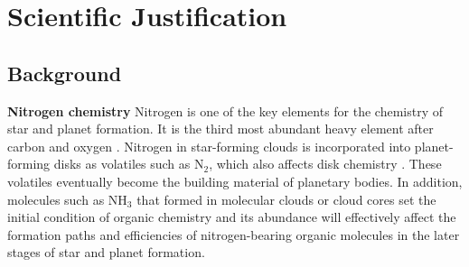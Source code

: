 \documentclass[12pt,a4paper]{article}  %
\newcommand{\ammonia}{NH$_3$\xspace}
\begin{document}
\pagestyle{plain}
 



\section{Scientific Justification}
\subsection{Background}
\noindent \textbf{Nitrogen chemistry} \quad Nitrogen is one of the key elements for the chemistry of star and planet formation. It is the third most abundant heavy element after carbon and oxygen \citep{Przybilla08}. Nitrogen in star-forming clouds is incorporated into planet-forming disks as volatiles such as N$_2$, which also affects disk chemistry \citep[e.g.,][]{Schwarz14}. These volatiles eventually become the building material of planetary bodies. In addition, molecules such as \ammonia that formed in molecular clouds or cloud cores set the initial condition of organic chemistry and its abundance will effectively affect the formation paths and efficiencies of nitrogen-bearing organic molecules in the later stages of star and planet formation.
\end{document}
